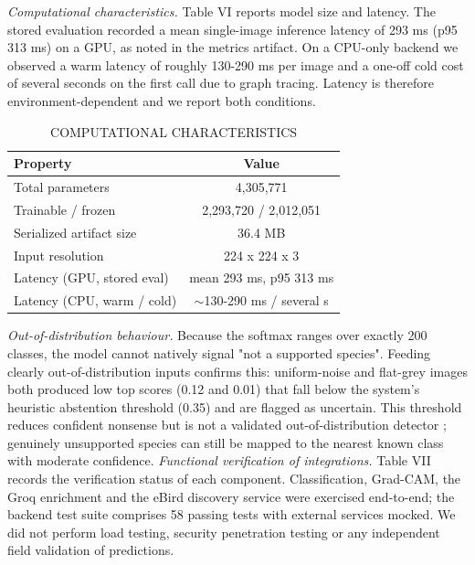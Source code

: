 \documentclass[conference]{IEEEtran}
\begin{document}
\textit{Computational characteristics.} Table VI reports model size and latency. The stored evaluation recorded a mean single-image inference latency of 293 ms (p95 313 ms) on a GPU, as noted in the metrics artifact. On a CPU-only backend we observed a warm latency of roughly 130-290 ms per image and a one-off cold cost of several seconds on the first call due to graph tracing. Latency is therefore environment-dependent and we report both conditions.
\begin{table}[t]
\centering
\caption{COMPUTATIONAL CHARACTERISTICS}
\label{tab:VI}
\footnotesize
\begin{tabular}{lc}
\toprule
\textbf{Property} & \textbf{Value} \\
\midrule
Total parameters & 4,305,771 \\
Trainable / frozen & 2,293,720 / 2,012,051 \\
Serialized artifact size & 36.4 MB \\
Input resolution & 224 x 224 x 3 \\
Latency (GPU, stored eval) & mean 293 ms, p95 313 ms \\
Latency (CPU, warm / cold) & $\sim$130-290 ms / several s \\
\bottomrule
\end{tabular}
\end{table}
\textit{Out-of-distribution behaviour.} Because the softmax ranges over exactly 200 classes, the model cannot natively signal "not a supported species". Feeding clearly out-of-distribution inputs confirms this: uniform-noise and flat-grey images both produced low top scores (0.12 and 0.01) that fall below the system's heuristic abstention threshold (0.35) and are flagged as uncertain. This threshold reduces confident nonsense but is not a validated out-of-distribution detector \cite{ref14}; genuinely unsupported species can still be mapped to the nearest known class with moderate confidence.
\textit{Functional verification of integrations.} Table VII records the verification status of each component. Classification, Grad-CAM, the Groq enrichment and the eBird discovery service were exercised end-to-end; the backend test suite comprises 58 passing tests with external services mocked. We did not perform load testing, security penetration testing or any independent field validation of predictions.
\end{document}
